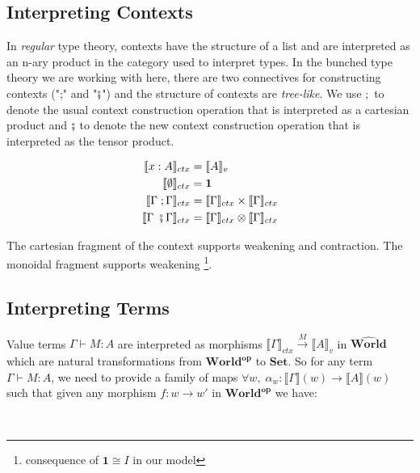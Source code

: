 \documentclass{article}
\newcommand{\pworld}{\widehat{\mathbf{World}}}
\begin{document}
\subsection{Interpreting Contexts}
In \textit{regular} type theory, contexts have the structure of a list and are interpreted as an n-ary product in the category used 
to interpret types. In the bunched type theory we are working with here, there are two connectives for constructing contexts 
(";" and "$\fatsemi$") and the structure of contexts are \textit{tree-like}. We use $;$ to denote the usual context construction operation 
that is interpreted as a cartesian product and $\fatsemi$ to denote the new context construction operation that is interpreted as the 
tensor product.

\begin{align*}
    \llbracket x : A \rrbracket_{ctx} &= \llbracket A \rrbracket_v \\
    \llbracket \emptyset \rrbracket_{ctx} &= \mathbf{1} \\
    \llbracket \Gamma \;; \Gamma \rrbracket_{ctx} &=  \llbracket \Gamma \rrbracket_{ctx} \times \llbracket \Gamma \rrbracket_{ctx}\\
    \llbracket \Gamma \;\fatsemi \Gamma \rrbracket_{ctx} &=  \llbracket \Gamma \rrbracket_{ctx} \otimes \llbracket \Gamma \rrbracket_{ctx} \\
\end{align*}

The cartesian fragment of the context supports weakening and contraction. The monoidal fragment supports weakening
\footnote{consequence of $\mathbf{1} \cong I$ in our model}.


\subsection{Interpreting Terms}
Value terms $\Gamma \vdash M : A$ are interpreted as morphisms 
$\llbracket \Gamma \rrbracket_{ctx} \xrightarrow{M} \llbracket A \rrbracket_{v}$ in $\pworld$ which are natural transformations 
from $\mathbf{World^{op}}$ to $\mathbf{Set}$. So for any term $\Gamma \vdash M : A$, we need to provide a family of maps 
$\forall w ,\; \alpha_w : \llbracket \Gamma \rrbracket(w) \rightarrow \llbracket A \rrbracket(w)$ such that given any morphism 
$f : w \rightarrow w'$ in $\mathbf{World^{op}}$ we have:
\begin{figure}[!ht]
    \centering

\end{figure}\\
\end{document}
